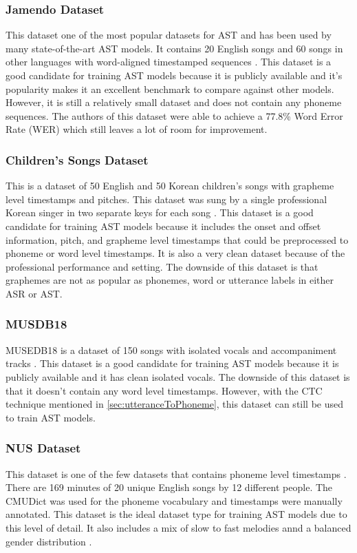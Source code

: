 \documentclass[letterpaper, 12pt]{article}
\begin{document}
\begin{multicols*}{2}
\subsubsection{Jamendo Dataset}
This dataset one of the most popular datasets for AST and has been used by many state-of-the-art
AST models. It contains 20 English songs and 60 songs in other languages with word-aligned timestamped sequences \citep{JamendoLyrics}. This dataset
is a good candidate for training AST models because it is publicly available and it's popularity
makes it an excellent benchmark to compare against other models. However, it is still a relatively
small dataset and does not contain any phoneme sequences. The authors of this dataset were able to
achieve a 77.8\% Word Error Rate (WER) which still leaves a lot of room for improvement.

\subsubsection{Children's Songs Dataset}
This is a dataset of 50 English and 50 Korean children's songs with grapheme level timestamps and
pitches. This dataset was sung by a single professional Korean singer in two separate keys for each
song \citep{ChildrensSongs}. This dataset is a good candidate for training AST models because it
includes the onset and offset information, pitch, and grapheme level timestamps that could be
preprocessed to phoneme or word level timestamps. It is also a very clean dataset because of the
professional performance and setting. The downside of this dataset is that graphemes are
not as popular as phonemes, word or utterance labels in either ASR or AST.

\subsubsection{MUSDB18}
MUSEDB18 is a dataset of 150 songs with isolated vocals and accompaniment tracks \citep{musdb18}. This
dataset is a good candidate for training AST models because it is publicly available and it has
clean isolated vocals. The downside of this dataset is that it doesn't contain any word level
timestamps. However, with the CTC technique mentioned in \ref{sec:utteranceToPhoneme}, this dataset
can still be used to train AST models.

\subsubsection{NUS Dataset}
This dataset is one of the few datasets that contains phoneme level timestamps \citep{NUSDataset}.
There are 169 minutes of 20 unique English songs by 12 different people. The CMUDict was used
for the phoneme vocabulary and timestamps were manually annotated. This dataset is the ideal dataset
type for training AST models due to this level of detail. It also includes a mix of slow to fast
melodies annd a balanced gender distribution \citep{NUSDataset}.



\end{multicols*}
\end{document}
